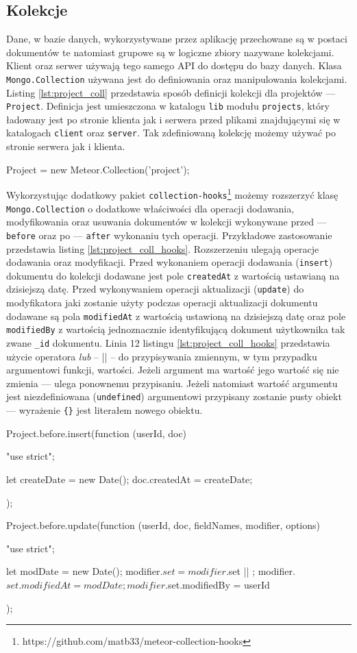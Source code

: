 \subsection{Kolekcje} 
Dane, w bazie danych, wykorzystywane przez aplikację przechowane są w postaci dokumentów te natomiast grupowe są w logiczne zbiory nazywane kolekcjami. Klient oraz serwer używają tego samego API do dostępu do bazy danych. Klasa \verb|Mongo.Collection| używana jest do definiowania oraz manipulowania kolekcjami. Listing \ref{lst:project_coll} przedstawia sposób definicji kolekcji dla projektów --- \verb|Project|. Definicja jest umieszczona w katalogu \verb|lib| modułu \verb|projects|, który ładowany jest po stronie klienta jak i serwera przed plikami znajdującymi się w katalogach \verb|client| oraz \verb|server|. Tak zdefiniowaną kolekcję możemy używać po stronie serwera jak i klienta. 
\begin{js}[caption={{Definicja kolekcji dla projektów \textit{Project}}},label={lst:project_coll}]
Project = new Meteor.Collection('project');
\end{js}

Wykorzystując dodatkowy pakiet \verb|collection-hooks|\footnote{https://github.com/matb33/meteor-collection-hooks} możemy rozszerzyć klasę \linebreak \verb|Mongo.Collection| o dodatkowe właściwości dla operacji dodawania, modyfikowania oraz usuwania dokumentów w kolekcji wykonywane przed --- \verb|before| oraz po --- \verb|after| wykonaniu tych operacji. Przykładowe zastosowanie przedstawia listing \ref{lst:project_coll_hooks}. Rozszerzeniu ulegają operacje dodawania oraz modyfikacji. Przed wykonaniem operacji dodawania (\verb|insert|) dokumentu do kolekcji dodawane jest pole \verb|createdAt| z wartością ustawianą na dzisiejszą datę. Przed wykonywaniem operacji aktualizacji (\verb|update|) do modyfikatora jaki zostanie użyty podczas operacji aktualizacji dokumentu dodawane są pola \verb|modifiedAt| z wartością ustawioną na dzisiejszą datę oraz pole \verb|modifiedBy| z wartością jednoznacznie identyfikującą dokument użytkownika tak zwane \verb|_id| dokumentu.
Linia 12 listingu \ref{lst:project_coll_hooks} przedstawia użycie operatora \textit{lub} -- \verb|||| -- do przypisywania zmiennym, w tym przypadku argumentowi funkcji, wartości. Jeżeli argument ma wartość jego wartość się nie zmienia --- ulega ponownemu przypisaniu. Jeżeli natomiast wartość argumentu jest niezdefiniowana (\verb|undefined|) argumentowi przypisany zostanie pusty obiekt --- wyrażenie \verb|{}| jest literałem nowego obiektu. 
\begin{js}[caption={{Rozszerzanie kolekcji \textit{Project} o dodatkowe właściwości}},label={lst:project_coll_hooks}]
Project.before.insert(function (userId, doc) {
    "use strict";
    
    let createDate = new Date();
    doc.createdAt = createDate;
});

Project.before.update(function (userId, doc, fieldNames, modifier, options) {
    "use strict";
    
    let modDate = new Date();
    modifier.$set = modifier.$set || {};
    modifier.$set.modifiedAt = modDate;
    modifier.$set.modifiedBy = userId
});
\end{js}

